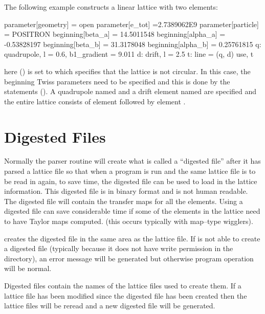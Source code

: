 The following example constructs a linear lattice with two elements: 
\begin{example}
  parameter[geometry] = open
  parameter[e_tot] =2.7389062E9
  parameter[particle] = POSITRON
  beginning[beta_a] = 14.5011548
  beginning[alpha_a] = -0.53828197
  beginning[beta_b] = 31.3178048
  beginning[alpha_b] = 0.25761815
  q: quadrupole, l = 0.6, b1_gradient = 9.011
  d: drift, l = 2.5
  t: line = (q, d)
  use, t 
\end{example}
here  () is set to 
which specifies that the lattice is not circular. In this case, the beginning 
Twiss parameters need to be specified and this is done by the 
statements (). A quadrupole named 
and a drift element named  are specified
and the entire lattice consists of element  followed by element .

\section{Digested Files}
\label{s:digested}

Normally the \bmad parser routine will create what is called a
``digested file'' after it has parsed a lattice file so that when a
program is run and the same lattice file is to be read in again, to save
time, the digested file can be used to load in the lattice information.
This digested file is in binary format and is not human readable. The
digested file will contain the transfer maps for all the elements. 
Using a digested file can save considerable time if some of the
elements in the lattice need to have Taylor maps computed.
(this occurs typically with map--type wigglers).

\bmad creates the digested file in the same area as the lattice file.
If \bmad is not able to create a digested file (typically because it
does not have write permission in the directory), an error message will
be generated but otherwise program operation will be normal.

Digested files contain the names of the lattice files used to create
them. If a lattice file has been modified since the digested file has
been created then the lattice files will be reread and a new
digested file will be generated. 

